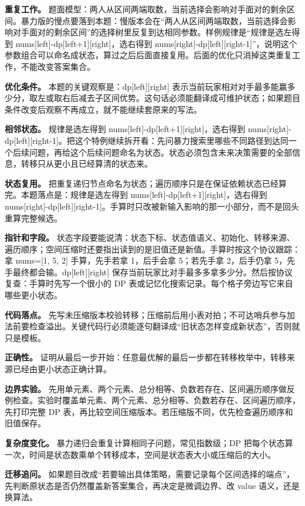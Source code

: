 \textbf{重复工作。} 题面模型：两人从区间两端取数，当前选择会影响对手面对的剩余区间。暴力版的慢点要落到本题：慢版本会在“两人从区间两端取数，当前选择会影响对手面对的剩余区间”的选择树里反复到达相同参数。样例规律是“规律是选左得到 nums[left]-dp[left+1][right]，选右得到 nums[right]-dp[left][right-1]”，说明这个参数组合可以命名成状态，算过之后后面直接复用。后面的优化只消掉这类重复工作，不能改变答案集合。

\textbf{优化条件。} 本题的关键观察是：dp[left][right] 表示当前玩家相对对手最多能赢多少分，取左或取右后减去子区间优势。这句话必须能翻译成可维护状态；如果题目条件改变后观察不再成立，就不能继续套原来的写法。

\textbf{相邻状态。} 规律是选左得到 nums[left]-dp[left+1][right]，选右得到 nums[right]-dp[left][right-1]。把这个特例继续拆开看：先问暴力搜索里哪些不同路径到达同一个后续问题，再给这个后续问题命名为状态。状态必须包含未来决策需要的全部信息，转移只从更小且已经算清的状态来。

\textbf{状态复用。} 把重复递归节点命名为状态；遍历顺序只是在保证依赖状态已经算完。本题落点是：规律是选左得到 nums[left]-dp[left+1][right]，选右得到 nums[right]-dp[left][right-1]。手算时只改被新输入影响的那一小部分，而不是回头重算完整候选。

\textbf{指针和字段。} 状态字段要能说清：状态下标、状态值语义、初始化、转移来源、遍历顺序；空间压缩时还要指出读到的是旧值还是新值。手算时按这个协议跟踪：拿 nums=[1, 5, 2] 手算，先手若拿 1，后手会拿 5；若先手拿 2，后手仍拿 5，先手最终都会输。dp[left][right] 保存当前玩家比对手最多多拿多少分。然后按协议复查：手算时先写一个很小的 DP 表或记忆化搜索记录。每个格子旁边写它来自哪些更小状态。

\textbf{代码落点。} 先写未压缩版本校验转移；压缩前后用小表对拍；不可达哨兵参与加法前要检查溢出。关键代码行必须能逐句翻译成“旧状态怎样变成新状态”，否则就只是模板。

\textbf{正确性。} 证明从最后一步开始：任意最优解的最后一步都在转移枚举中，转移来源已经由更小状态正确计算。

\textbf{边界实验。} 先用单元素、两个元素、总分相等、负数若存在、区间遍历顺序做反例检查。实验时覆盖单元素、两个元素、总分相等、负数若存在、区间遍历顺序，先打印完整 DP 表，再比较空间压缩版本。若压缩版不同，优先检查遍历顺序和旧值保存。

\textbf{复杂度变化。} 暴力递归会重复计算相同子问题，常见指数级；DP 把每个状态算一次，时间是状态数乘单个转移成本，空间是状态表大小或压缩后的大小。

\textbf{迁移追问。} 如果题目改成“若要输出具体策略，需要记录每个区间选择的端点”，先判断原状态是否仍然覆盖新答案集合，再决定是微调边界、改 value 语义，还是换算法。

